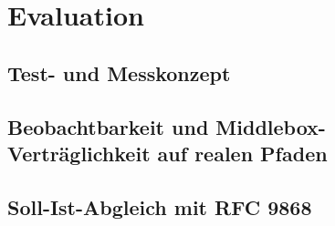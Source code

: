 
\chapter{Evaluation}
\label{chap:evaluation}

\section{Test- und Messkonzept}
\label{sec:testkonzept}

\section[Beobachtbarkeit und Middlebox-Verträglichkeit auf realen Pfaden]%
{Beobachtbarkeit und Middlebox-\\Verträglichkeit auf realen Pfaden}
\label{sec:beobachtbarkeit-eval}

\section{Soll-Ist-Abgleich mit RFC 9868}
\label{sec:soll-ist}
